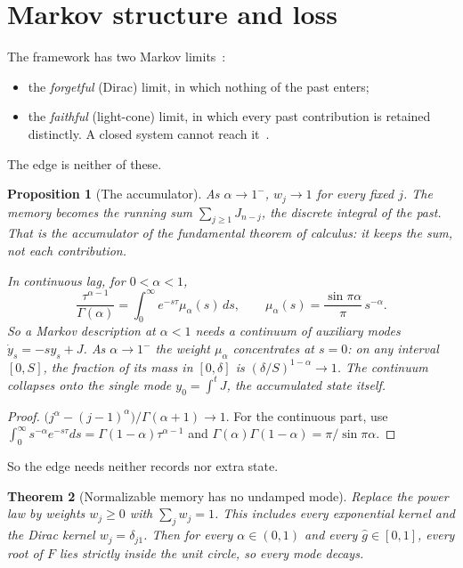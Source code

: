 \documentclass[11pt]{amsart}
\newtheorem{theorem}{Theorem}[section]
\newtheorem{proposition}[theorem]{Proposition}
\theoremstyle{definition}
\theoremstyle{remark}
\begin{document}
\section{Markov structure and loss}\label{sec:markov}

The framework has two Markov limits~\cite[Sec.~1]{Info}:
\begin{itemize}
\item the \emph{forgetful} (Dirac) limit, in which nothing of the past enters;
\item the \emph{faithful} (light-cone) limit, in which every past contribution is retained distinctly. A closed system cannot reach it~\cite[Sec.~2]{Info}.
\end{itemize}
The edge is neither of these.

\begin{proposition}[The accumulator]\label{prop:embedding}
As $\alpha\to1^-$, $w_j\to1$ for every fixed $j$. The memory becomes the running sum $\sum_{j\ge1}J_{n-j}$, the discrete integral of the past. That is the accumulator of the fundamental theorem of calculus: it keeps the sum, not each contribution.

In continuous lag, for $0<\alpha<1$,
\[
\frac{\tau^{\alpha-1}}{\Gamma(\alpha)}=\int_0^\infty e^{-s\tau}\mu_\alpha(s)\,ds,\qquad \mu_\alpha(s)=\frac{\sin\pi\alpha}{\pi}\,s^{-\alpha}.
\]
So a Markov description at $\alpha<1$ needs a continuum of auxiliary modes $\dot y_s=-sy_s+J$. As $\alpha\to1^-$ the weight $\mu_\alpha$ concentrates at $s=0$: on any interval $[0,S]$, the fraction of its mass in $[0,\delta]$ is $(\delta/S)^{1-\alpha}\to1$. The continuum collapses onto the single mode $y_0=\int^tJ$, the accumulated state itself.
\end{proposition}

\begin{proof}
$\big(j^\alpha-(j-1)^\alpha\big)/\Gamma(\alpha+1)\to1$. For the continuous part, use $\int_0^\infty s^{-\alpha}e^{-s\tau}ds=\Gamma(1-\alpha)\tau^{\alpha-1}$ and $\Gamma(\alpha)\Gamma(1-\alpha)=\pi/\sin\pi\alpha$. \end{proof}

So the edge needs neither records nor extra state.

\begin{theorem}[Normalizable memory has no undamped mode]\label{thm:normalizable}
Replace the power law by weights $w_j\ge0$ with $\sum_jw_j=1$. This includes every exponential kernel and the Dirac kernel $w_j=\delta_{j1}$. Then for every $\alpha\in(0,1)$ and every $\hat g\in[0,1]$, every root of $F$ lies strictly inside the unit circle, so every mode decays.
\end{theorem}
\end{document}
